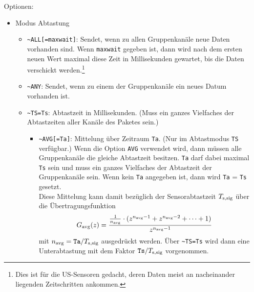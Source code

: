 Optionen:
\begin{itemize}
	\item Modus Abtastung
		\begin{itemize}
			\item \verb+~ALL[=maxwait]+: Sendet, wenn zu allen Gruppenkanäle neue Daten vorhanden sind. Wenn \verb+maxwait+ gegeben ist, dann wird nach dem ersten neuen Wert maximal diese Zeit in Millisekunden gewartet, bis die Daten verschickt werden.\footnote{Dies ist \zB für die US-Sensoren gedacht, deren Daten meist an nacheinander liegenden Zeitschritten ankommen.}
			\item \verb+~ANY+: Sendet, wenn zu einem der Gruppenkanäle ein neues Datum vorhanden ist.
			\item \verb+~TS=Ts+: Abtastzeit in Millisekunden. (Muss ein ganzes Vielfaches der Abtastzeiten aller Kanäle des Paketes sein.)
			\begin{itemize}
				\item \verb+~AVG[=Ta]+: Mittelung über Zeitraum \verb|Ta|. (Nur im Abtastmodus \verb|TS| verfügbar.) Wenn die Option \verb|AVG| verwendet wird, dann müssen alle Gruppenkanäle die gleiche Abtastzeit besitzen. \verb|Ta| darf dabei maximal \verb|Ts| sein und muss ein ganzes Vielfaches der Abtastzeit der Gruppenkanäle sein. Wenn kein \verb|Ta| angegeben ist, dann wird \verb|Ta| = \verb|Ts| gesetzt.\\
				Diese Mittelung kann damit bezüglich der Sensorabtastzeit $T_{\mathrm{s,sig}}$ über die Übertragungsfunktion
				\begin{align*}
					G_{\mathrm{avg}}(z) = \frac{\frac{1}{n_{\mathrm{avg}}} \cdot ( z^{n_{\mathrm{avg}}-1} + z^{n_{\mathrm{avg}}-2} + \cdots + 1)}{z^{n_{\mathrm{avg}}-1}}
				\end{align*}
				mit $n_{\mathrm{avg}} = \mathtt{Ta}/T_{\mathrm{s,sig}}$ ausgedrückt werden. Über \verb+~TS=Ts+ wird dann eine Unterabtastung mit dem Faktor $\mathtt{Ts}/T_{\mathrm{s,sig}}$ vorgenommen.
			\end{itemize}
			

\end{itemize}
\end{itemize}
